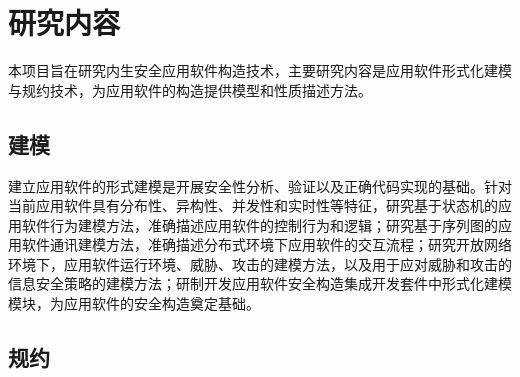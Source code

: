 \chapter{研究内容}
本项目旨在研究内生安全应用软件构造技术，主要研究内容是应用软件形式化建模与规约技术，为应用软件的构造提供模型和性质描述方法。
\section{建模}

\par
建立应用软件的形式建模是开展安全性分析、验证以及正确代码实现的基础。针对当前应用软件具有分布性、异构性、并发性和实时性等特征，研究基于状态机的应用软件行为建模方法，准确描述应用软件的控制行为和逻辑；研究基于序列图的应用软件通讯建模方法，准确描述分布式环境下应用软件的交互流程；研究开放网络环境下，应用软件运行环境、威胁、攻击的建模方法，以及用于应对威胁和攻击的信息安全策略的建模方法；研制开发应用软件安全构造集成开发套件中形式化建模模块，为应用软件的安全构造奠定基础。
\par

\section{规约}
